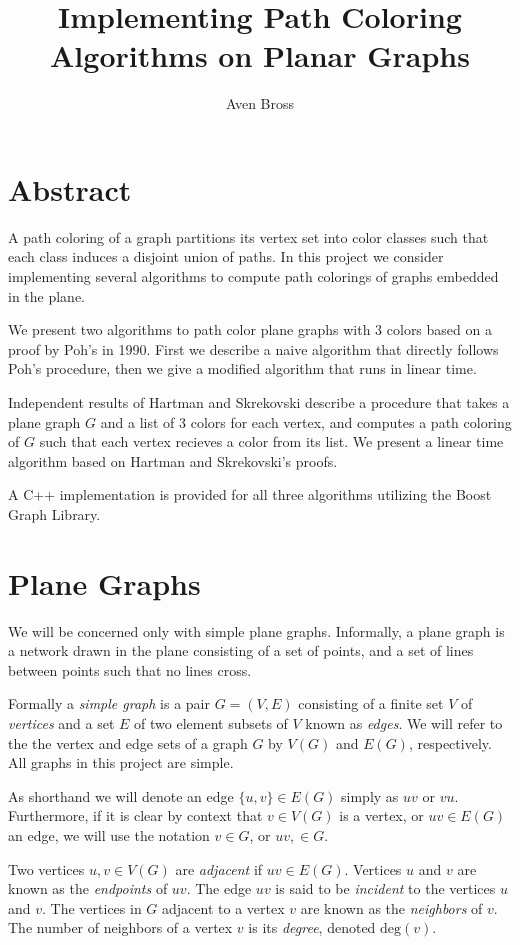 \documentclass[letterpaper, 12pt]{article}
\title{Implementing Path Coloring Algorithms on Planar Graphs}
\author{Aven Bross}
\theoremstyle{definition}
\theoremstyle{definition}
\theoremstyle{thm}
\theoremstyle{definition}
\begin{document}
\maketitle

\section*{Abstract}
A path coloring of a graph partitions its vertex set into color classes such
that each class induces a disjoint union of paths. In this project we consider
implementing several algorithms to compute path colorings of graphs embedded in
the plane.

We present two algorithms to path color plane graphs with $3$ colors
based on a proof by Poh's in 1990. First we describe a naive algorithm that
directly follows Poh's procedure, then we give a modified algorithm
that runs in linear time.

Independent results of Hartman and Skrekovski describe a procedure that takes
a plane graph $G$ and a list of $3$ colors for each vertex, and
computes a path coloring of $G$ such that each vertex recieves a color from its
list. We present a linear time algorithm based on Hartman and Skrekovski's
proofs.

A C++ implementation is provided for all three algorithms utilizing the Boost
Graph Library.

\section{Plane Graphs}

We will be concerned only with simple plane graphs. Informally, a plane graph
is a network drawn in the plane consisting of a set of points, and a set of
lines between points such that no lines cross.

Formally a \textit{simple graph} is a pair $G=(V,E)$ consisting of a finite set
$V$ of \textit{vertices} and a set $E$ of two element subsets of $V$ known as
\textit{edges}. We will refer to the the vertex and edge sets of a graph $G$ by
$V(G)$ and $E(G)$, respectively. All graphs in this project are simple.

As shorthand we will denote an edge $\{u,v\}\in E(G)$ simply as $uv$ or $vu$.
Furthermore, if it is clear by context that $v\in V(G)$ is a vertex, or $uv\in
E(G)$ an edge, we will use the notation $v\in G$, or $uv,\in G$.

Two vertices $u,v\in V(G)$ are \textit{adjacent} if $uv\in E(G)$. Vertices $u$
and $v$ are known as the \textit{endpoints} of $uv$. The edge $uv$ is said to be
\textit{incident} to the vertices $u$ and $v$. The vertices in $G$ adjacent to a
vertex $v$ are known as the \textit{neighbors} of $v$. The number of neighbors
of a vertex $v$ is its \textit{degree}, denoted $\text{deg}(v)$.
\end{document}
